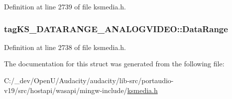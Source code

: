 Definition at line 2739 of file ksmedia.\+h.

\subsubsection[{\texorpdfstring{Data\+Range}{DataRange}}]{ tag\+K\+S\+\_\+\+D\+A\+T\+A\+R\+A\+N\+G\+E\+\_\+\+A\+N\+A\+L\+O\+G\+V\+I\+D\+E\+O\+::\+Data\+Range}\hypertarget{structtag_k_s___d_a_t_a_r_a_n_g_e___a_n_a_l_o_g_v_i_d_e_o_ac4af119aa2fbf1fd1065f5b5fd92e190}{}\label{structtag_k_s___d_a_t_a_r_a_n_g_e___a_n_a_l_o_g_v_i_d_e_o_ac4af119aa2fbf1fd1065f5b5fd92e190}


Definition at line 2738 of file ksmedia.\+h.



The documentation for this struct was generated from the following file\+:\begin{DoxyCompactItemize}
\item 
C\+:/\+\_\+dev/\+Open\+U/\+Audacity/audacity/lib-\/src/portaudio-\/v19/src/hostapi/wasapi/mingw-\/include/\hyperlink{ksmedia_8h}{ksmedia.\+h}\end{DoxyCompactItemize}
